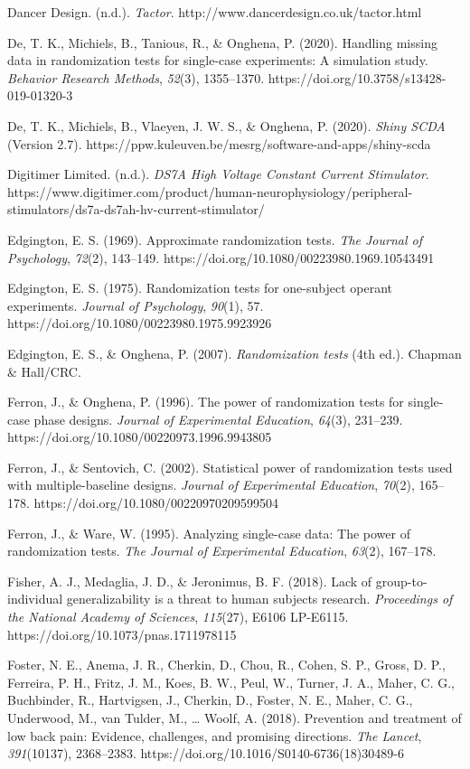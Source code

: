 \documentclass{article}
\begin{document}
Dancer Design. (n.d.). \emph{Tactor}. http://www.dancerdesign.co.uk/tactor.html

De, T. K., Michiels, B., Tanious, R., \& Onghena, P. (2020). Handling missing data in randomization tests for single-case experiments: A simulation study. \emph{Behavior Research Methods}, \emph{52}(3), 1355--1370. https://doi.org/10.3758/s13428-019-01320-3

De, T. K., Michiels, B., Vlaeyen, J. W. S., \& Onghena, P. (2020). \emph{Shiny SCDA} (Version 2.7). https://ppw.kuleuven.be/mesrg/software-and-apps/shiny-scda

Digitimer Limited. (n.d.). \emph{DS7A High Voltage Constant Current Stimulator}. https://www.digitimer.com/product/human-neurophysiology/peripheral-stimulators/ds7a-ds7ah-hv-current-stimulator/

Edgington, E. S. (1969). Approximate randomization tests. \emph{The Journal of Psychology}, \emph{72}(2), 143--149. https://doi.org/10.1080/00223980.1969.10543491

Edgington, E. S. (1975). Randomization tests for one-subject operant experiments. \emph{Journal of Psychology}, \emph{90}(1), 57. https://doi.org/10.1080/00223980.1975.9923926

Edgington, E. S., \& Onghena, P. (2007). \emph{Randomization tests} (4th ed.). Chapman \& Hall/CRC.

Ferron, J., \& Onghena, P. (1996). The power of randomization tests for single-case phase designs. \emph{Journal of Experimental Education}, \emph{64}(3), 231--239. https://doi.org/10.1080/00220973.1996.9943805

Ferron, J., \& Sentovich, C. (2002). Statistical power of randomization tests used with multiple-baseline designs. \emph{Journal of Experimental Education}, \emph{70}(2), 165--178. https://doi.org/10.1080/00220970209599504

Ferron, J., \& Ware, W. (1995). Analyzing single-case data: The power of randomization tests. \emph{The Journal of Experimental Education}, \emph{63}(2), 167--178.

Fisher, A. J., Medaglia, J. D., \& Jeronimus, B. F. (2018). Lack of group-to-individual generalizability is a threat to human subjects research. \emph{Proceedings of the National Academy of Sciences}, \emph{115}(27), E6106 LP-E6115. https://doi.org/10.1073/pnas.1711978115

Foster, N. E., Anema, J. R., Cherkin, D., Chou, R., Cohen, S. P., Gross, D. P., Ferreira, P. H., Fritz, J. M., Koes, B. W., Peul, W., Turner, J. A., Maher, C. G., Buchbinder, R., Hartvigsen, J., Cherkin, D., Foster, N. E., Maher, C. G., Underwood, M., van Tulder, M., … Woolf, A. (2018). Prevention and treatment of low back pain: Evidence, challenges, and promising directions. \emph{The Lancet}, \emph{391}(10137), 2368--2383. https://doi.org/10.1016/S0140-6736(18)30489-6
\end{document}
